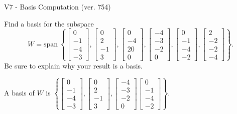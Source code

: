\begin{exercise}
  \begin{exerciseTitle}V7 - Basis Computation (ver. 754)\end{exerciseTitle}
  \begin{exerciseStatement}
    Find a basis for the subspace 
\[W=\mathrm{span}\ \left\{\left[\begin{array}{r}
0 \\
-1 \\
-4 \\
-3
\end{array}\right] , \left[\begin{array}{r}
0 \\
2 \\
-1 \\
3
\end{array}\right] , \left[\begin{array}{r}
0 \\
-4 \\
20 \\
0
\end{array}\right] , \left[\begin{array}{r}
-4 \\
-3 \\
-2 \\
0
\end{array}\right] , \left[\begin{array}{r}
0 \\
-1 \\
-4 \\
-2
\end{array}\right] , \left[\begin{array}{r}
2 \\
-2 \\
-2 \\
-4
\end{array}\right]\right\}.\]
 Be sure to explain why your result is a basis.


  \end{exerciseStatement}
  \begin{exerciseAnswer}
   A basis of \(W\) is  \(\left\{\left[\begin{array}{r}
0 \\
-1 \\
-4 \\
-3
\end{array}\right] , \left[\begin{array}{r}
0 \\
2 \\
-1 \\
3
\end{array}\right] , \left[\begin{array}{r}
-4 \\
-3 \\
-2 \\
0
\end{array}\right] \left[\begin{array}{r}
0 \\
-1 \\
-4 \\
-2
\end{array}\right]\right\}\).
  


  \end{exerciseAnswer}
\end{exercise}
